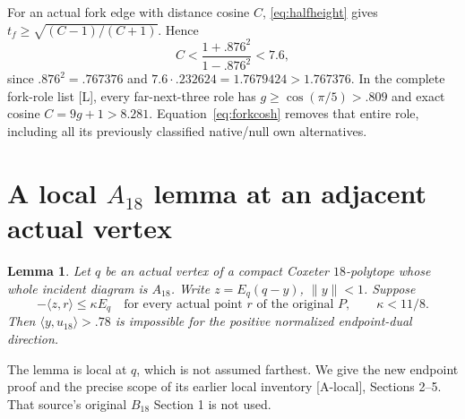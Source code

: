 \documentclass[11pt]{article}
\newtheorem{lemma}[theorem]{Lemma}
\theoremstyle{definition}
\theoremstyle{remark}
\newcommand{\ip}[2]{\langle #1,#2\rangle}
\newcommand{\norm}[1]{\lVert #1\rVert}
\newcommand{\src}[1]{\textnormal{\textsf{[#1]}}}
\begin{document}
For an actual fork edge with distance cosine \(C\),
\eqref{eq:halfheight} gives
\(t_f\geq\sqrt{(C-1)/(C+1)}\). Hence
\begin{equation}
\label{eq:forkcosh}
 C<\frac{1+.876^2}{1-.876^2}<7.6,
\end{equation}
since \(.876^2=.767376\) and
\(7.6\cdot.232624=1.7679424>1.767376\).
In the complete fork-role list \src{L}, every far-next-three
role has \(g\geq\cos(\pi/5)>.809\) and exact cosine
\(C=9g+1>8.281\). Equation~\eqref{eq:forkcosh} removes that
entire role, including all its previously classified native/null
own alternatives.

\section{A local \(A_{18}\) lemma at an adjacent actual vertex}
\label{sec:localA18}
\begin{lemma}
\label{lem:localA18}
Let \(q\) be an actual vertex of a compact Coxeter
\(18\)-polytope whose whole incident diagram is \(A_{18}\).
Write \(z=E_q(q-y)\), \(\norm{y}<1\). Suppose
\[
 -\ip{z}{r}\leq\kappa E_q
 \quad\text{for every actual point }r\text{ of the original }P,
 \qquad\kappa<11/8.
\]
Then \(\ip{y}{u_{18}}>.78\) is impossible for the positive
normalized endpoint-dual direction.
\end{lemma}
The lemma is local at \(q\), which is not assumed farthest.
We give the new endpoint proof and the precise scope of its
earlier local inventory \src{A-local}, Sections 2--5.
That source's original \(B_{18}\) Section 1 is not used.
\end{document}
